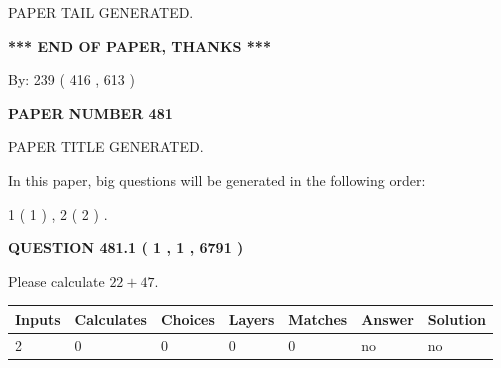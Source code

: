 \documentclass[12pt]{article}
\begin{document}
   
   
   
   
   
 \vspace{0.2in}
 
   
   
\vspace{2.0in} PAPER TAIL GENERATED.
   
   
   
   
\vspace{1.0in} 
{\textbf{\large{ *** END OF PAPER, THANKS *** }}} 
   
   
\hspace{1.0in} By: 
 239 ( 416 ,  613 )
   
   
   
   
\newpage 
\setcounter{page}{ 
   481001 } 
   
   
   
   
 {\textbf{ \Large{ PAPER NUMBER  481  }}}
   
   
\vspace{0.2in}
   
   
   
   
   
   
   
   
 \vspace{0.2in}
 
 
 
 
   
   
 PAPER TITLE GENERATED.
   
   
   
\vspace{0.2in}
   
In this paper, big questions will be generated in the following order: 
   
   
   1 ( 1 )
 ,
   2 ( 2 )
 .
  
\vspace{0.2in}
  
{\textbf{\Large{QUESTION
481.1 
 ( 1 , 1 , 6791 )
}}}
  
  
 
Please calculate $ %
22 +  %
47 $.
 
 
   
   
   
   
\noindent\begin{tabular}{|l|l|l|l|l|l|l|}
 \hline
Inputs & Calculates & Choices & Layers & Matches & Answer & Solution \\ \hline
 2  & 
 0  & 
 0
  & 
 0  & 
 0  & 
  no & 
  no 
  \\ \hline
 \end{tabular}
   
\end{document}
